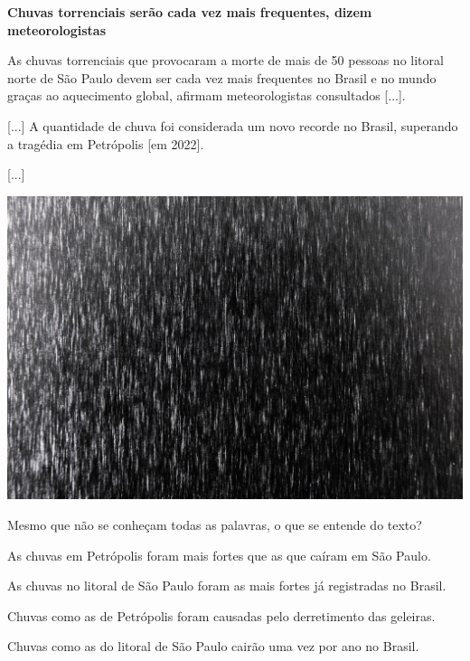 \begin{myquote}
\textbf{Chuvas torrenciais serão cada vez mais frequentes, dizem
meteorologistas}

As chuvas torrenciais que provocaram a morte de mais de 50 pessoas no
litoral norte de São Paulo devem ser cada vez mais frequentes no Brasil
e no mundo graças ao aquecimento global, afirmam meteorologistas
consultados {[}...{]}.

{[}...{]} A quantidade de chuva foi considerada um novo recorde no
Brasil, superando a tragédia em Petrópolis {[}em 2022{]}.

{[}...{]}

\begin{center}
\includegraphics[width=.5\textwidth]{./media/image23h1.jpg}
\end{center}


\end{myquote}

Mesmo que não se conheçam todas as palavras, o que se entende do texto?

\begin{escolha}
\item As chuvas em Petrópolis foram mais fortes que as que caíram em São Paulo.

\item As chuvas no litoral de São Paulo foram as mais fortes já registradas no Brasil.

\item Chuvas como as de Petrópolis foram causadas pelo derretimento das geleiras.

\item Chuvas como as do litoral de São Paulo cairão uma vez por ano no Brasil.
\end{escolha}

